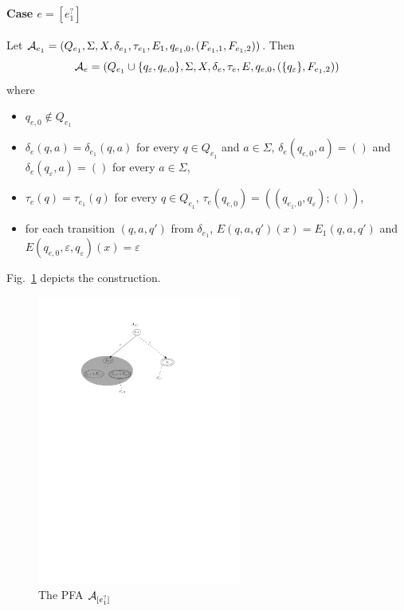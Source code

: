 
\paragraph{Case $e = [e_1^?]$} Let $\mathcal{A}_{e_1} = (Q_{e_1}, \Sigma, X, \delta_{e_1}, \tau_{e_1}, E_1, q_{e_1,0}, (F_{e_1,1}, F_{e_1,2}))$. Then 
\[\mathcal{A}_e = (Q_{e_1} \cup \{q_{\varepsilon}, q_{e,0}\}, \Sigma, X, 
		\delta_e, \tau_e, E, q_{e,0}, (\{q_{\varepsilon}\}, F_{e_1,2}))\]
where  
		\begin{itemize}
			\item $q_{e,0}  \not \in Q_{e_1}$
			\item $\delta_e(q, a) = \delta_{e_1}(q, a)$ for every $q \in Q_{e_1}$ and $a \in \Sigma$, $\delta_e(q_{e,0}, a)  = ()$ and $\delta_e(q_{\varepsilon}, a) = ()$ for every $a \in \Sigma$, 
			\item $\tau_e(q) = \tau_{e_1}(q)$ for every $q \in Q_{e_1}$, $\tau_e(q_{e,0}) = ((q_{e_1,0},q_{\varepsilon}); ())$,
			\item for each transition $(q, a, q')$ from $\delta_{e_1}$, $E(q,a,q')(x) =E_1(q, a,q')$ and $E(q_{e,0},\varepsilon,q_{\varepsilon})(x) =\varepsilon$
		\end{itemize}
%
Fig.~\ref{fig-reg2pfa-6} depicts the construction.
		\begin{figure}[ht]
			\centering
			\includegraphics[width = 0.6\textwidth]{reg2pfa-6.pdf}
			\caption{The PFA $\mathcal{A}_{[e_1^?]}$}
			\label{fig-reg2pfa-6}
		\end{figure}

